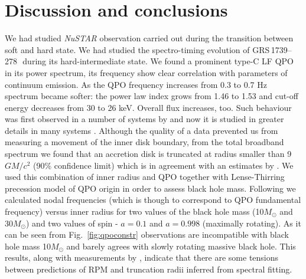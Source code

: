\documentclass[a4paper,fleqn,usenatbib]{mnras}
\def\grs{{GRS\,1739--278\,}}
\begin{document}
\section{Discussion and conclusions}
We had studied {\it NuSTAR} observation carried out during the transition between soft and hard state. 
We had studied the spectro-timing evolution of \grs\, during its hard-intermediate state.  
We found a prominent type-C LF QPO in its power spectrum, its frequency show clear correlation with parameters of continuum emission. 
As the QPO frequency increases from 0.3 to 0.7 Hz spectrum became softer: the power law index grows from 1.46 to 1.53 and cut-off energy decreases from 30 to 26 keV. 
Overall flux increases, too. 
Such behaviour was first observed in a number of systems by \citet{dimatteo99} and now it is studied in greater details in many systems \citep[see e.g.][ and many more]{vignarca03,stiele13,seifina14,fuerst16_gx339}. 
Although the quality of a data prevented us from measuring a movement of the inner disk boundary, from the total broadband spectrum we found that an accretion disk is truncated at radius smaller than 9 $GM/c^{2}$ (90\% confidence limit) which is in agreement with an estimates by \citet{miller15_nust}. 
We used this combination of inner radius and QPO together with Lense-Thirring precession model of QPO origin \citep{ingram09} in order to assess black hole mass. 
Following \citet{ingram14} we calculated nodal frequencies (which is though to correspond to QPO fundamental frequency) versus inner radius for two values of the black hole mass (10$M_{\odot}$ and 30$M_{\odot}$) and two values of spin - $a=0.1$ and $a=0.998$ (maximally rotating). 
As it can be seen from Fig.~\ref{fig:qpoconstr} observations are incompatible with black hole mass 10$M_{\odot}$ and barely agrees with slowly rotating massive black hole. 
This results, along with measurements by \cite{fuerst16_gx339}, indicate that there are some tensions between predictions of RPM and truncation radii inferred from spectral fitting.
\end{document}

